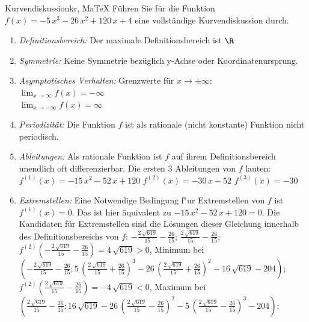  \providecommand{\MoIl}{(} 
 \providecommand{\MoIr}{)}
 \providecommand{\MIntvlSep}{;} 
 \providecommand{\MElSetSep}{;} 
 \begin{MAufgabe}{Kurvendiskussion}{kr, MaTeX}
 F\"uhren Sie f\"ur die Funktion $f(x)= - 5\, x^3 - 26\, x^2 + 120\, x + 4$ eine vollst\"andige Kurvendiskussion durch.\\ 
 \ifLsg\Loesung
 \begin{enumerate}
 \item \emph{Definitionsbereich:} 
 Der maximale Definitionsbereich ist $\R$\item \emph{Symmetrie:} 
 Keine Symmetrie bez\"uglich y-Achse oder Koordinatenursprung.\item \emph{Asymptotisches Verhalten:} 
 Grenzwerte f\"ur $x\rightarrow \pm \infty$: \\ 
 $\lim_{x\rightarrow \infty} f(x)=- \infty$ \\ 
 $\lim_{x\rightarrow -\infty} f(x)=\infty$ \\ 
 \item \emph{Periodizit\"at:} 
 Die Funktion $f$ ist als rationale (nicht konstante) Funktion nicht periodisch.\item \emph{Ableitungen:} 
 Als rationale Funktion ist $f$ auf ihrem Definitionsbereich unendlich oft differenzierbar. 
 Die ersten 3 Ableitungen von $f$ lauten: \\ 
 $f^{(1)}(x)= - 15\, x^2 - 52\, x + 120$\newline 
  $f^{(2)}(x)= - 30\, x - 52$\newline 
  $f^{(3)}(x)=-30$\newline 
  \item \emph{Extremstellen:} 
 Eine Notwendige Bedingung f"ur Extremstellen von $f$ ist $f^{(1)}(x)=0$. 
 Das ist hier \"aquivalent zu $ - 15\, x^2 - 52\, x + 120=0$. 
 Die Kandidaten f\"ur Extremstellen sind die L\"osungen dieser Gleichung innerhalb des Definitionsbereichs von $f$: $ - \frac{2\, \sqrt{619}}{15} - \frac{26}{15}$; $\frac{2\, \sqrt{619}}{15} - \frac{26}{15}$; \\ 
 $f^{(2)}( - \frac{2\, \sqrt{619}}{15} - \frac{26}{15})=4\, \sqrt{619}$$>0$, Minimum bei $( - \frac{2\, \sqrt{619}}{15} - \frac{26}{15};5\, {\left(\frac{2\, \sqrt{619}}{15} + \frac{26}{15}\right)}^3 - 26\, {\left(\frac{2\, \sqrt{619}}{15} + \frac{26}{15}\right)}^2 - 16\, \sqrt{619} - 204)$; \\ 
 $f^{(2)}(\frac{2\, \sqrt{619}}{15} - \frac{26}{15})=- 4\, \sqrt{619}$$<0$, Maximum bei $(\frac{2\, \sqrt{619}}{15} - \frac{26}{15};16\, \sqrt{619} - 26\, {\left(\frac{2\, \sqrt{619}}{15} - \frac{26}{15}\right)}^2 - 5\, {\left(\frac{2\, \sqrt{619}}{15} - \frac{26}{15}\right)}^3 - 204)$; \\ 

\end{enumerate}
\end{MAufgabe}
